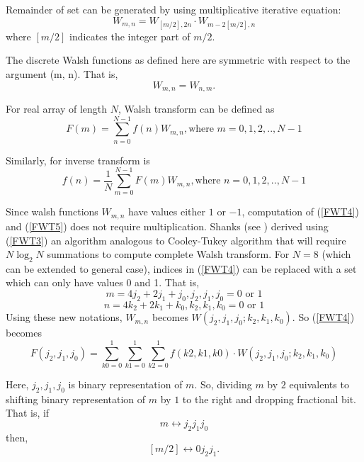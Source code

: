 Remainder of set can be generated by using multiplicative iterative equation: 
\begin{equation}
\label{FWT3}
W_{m,n} = W_{[m/2],2n}\cdot W_{m-2[m/2], n}
\end{equation}
where $[m/2]$ indicates the integer part of $m/2$.

The discrete Walsh functions as defined here are symmetric with respect to the argument (m, n). That is,
\[
W_{m, n} = W_{n,m}.
\]

For real array of length $N$, Walsh transform can be defined as 
\begin{equation}
\label{FWT4}
F(m) = \sum\limits_{n=0}^{N-1} f(n) W_{m,n}, \text{where $m = 0, 1, 2,.., N-1$}
\end{equation}

Similarly, for inverse transform is
\begin{equation}
\label{FWT5}
f(n) = \frac{1}{N}\sum\limits_{m=0}^{N-1} F(m) W_{m,n}, \text{where $n = 0, 1, 2,.., N-1$}
\end{equation}

Since walsh functions $W_{m,n}$ have values either $1$ or $-1$, computation of (\ref{FWT4}) and (\ref{FWT5}) does not require multiplication.
Shanks (see \cite{Shanks1969}) derived using (\ref{FWT3}) an algorithm analogous to Cooley-Tukey algorithm that will require $N \log_2 N$ summations to compute complete Walsh transform. \linebreak
For $N = 8$ (which can be extended to general case),\linebreak
indices in (\ref{FWT4}) can be replaced with a set which can only have values 0 and 1. That is, 
\begin{equation}
\label{FWT6}
m = 4j_2 + 2j_1 + j_0, \text{$j_2, j_1, j_0 = 0$ or $1$}
\end{equation}
\begin{equation}
\label{FWT7}
n = 4k_2 + 2k_1 + k_0, \text{$k_2, k_1, k_0 = 0$ or $1$}
\end{equation}
Using these new notations, $W_{m,n}$ becomes $W(j_2,j_1,j_0;k_2,k_1,k_0)$. So (\ref{FWT4}) becomes 
\begin{equation}
\label{FWT8}
F(j_2,j_1,j_0) = \sum\limits_{k0 = 0}^1 \sum\limits_{k1 = 0}^1 \sum\limits_{k2 = 0}^1 f(k2,k1,k0) \cdot W(j_2,j_1,j_0;k_2,k_1,k_0)
\end{equation}

Here, $j_2,j_1,j_0$ is binary representation of $m$. So, dividing $m$ by $2$ equivalents to shifting binary representation of $m$ by $1$ to the right and dropping fractional bit. That is, if 
\[
m \leftrightarrow j_2j_1j_0
\]
then,
\[
[m/2] \leftrightarrow 0j_2j_1.
\]

